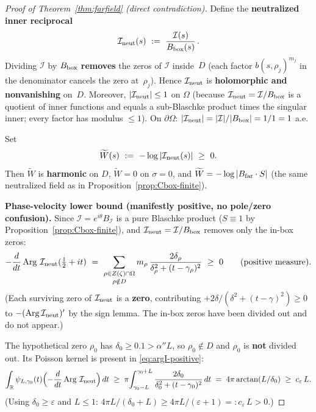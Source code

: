 \documentclass[11pt]{amsart}
\theoremstyle{definition}
\theoremstyle{remark}
\DeclareMathOperator{\Arg}{Arg}
\begin{document}
\begin{proof}[Proof of Theorem~\ref{thm:farfield} (direct contradiction)]
Define the \textbf{neutralized inner reciprocal}
\[
  \mathcal I_{\rm neut}(s)\ :=\ \frac{\mathcal I(s)}{B_{\rm box}(s)}\,.
\]
Dividing \(\mathcal I\) by \(B_{\rm box}\) \textbf{removes} the zeros of \(\mathcal I\) inside~\(D\)
(each factor \(b(s,\rho_j)^{m_j}\) in the denominator cancels the zero at~\(\rho_j\)).
Hence \(\mathcal I_{\rm neut}\) is \textbf{holomorphic and nonvanishing} on~\(D\).
Moreover, \(|\mathcal I_{\rm neut}|\le 1\) on \(\Omega\)
(because \(\mathcal I_{\rm neut}=\mathcal I/B_{\rm box}\) is a quotient of inner functions
and equals a sub-Blaschke product times the singular inner; every factor has modulus \(\le 1\)).
On \(\partial\Omega\): \(|\mathcal I_{\rm neut}|=|\mathcal I|/|B_{\rm box}|=1/1=1\) a.e.

Set
\[
  \widetilde W(s)\ :=\ -\log|\mathcal I_{\rm neut}(s)|\ \ge\ 0.
\]
Then \(\widetilde W\) is \textbf{harmonic} on \(D\), \(\widetilde W=0\) on \(\sigma=0\),
and \(\widetilde W=-\log|B_{\rm far}\cdot S|\) (the same neutralized field
as in Proposition~\ref{prop:Cbox-finite}).

\medskip
\noindent\textbf{Phase-velocity lower bound (manifestly positive, no pole/zero confusion).}
Since \(\mathcal I=e^{i\theta}B_{\mathcal I}\) is a pure Blaschke product
(\(S\equiv 1\) by Proposition~\ref{prop:Cbox-finite}),
and \(\mathcal I_{\rm neut}=\mathcal I/B_{\rm box}\) removes only the in-box zeros:
\begin{equation}\label{eq:argI-positive}
  -\frac{d}{dt}\Arg\,\mathcal I_{\rm neut}(\tfrac12+it)
  \ =\ \sum_{\substack{\rho\in Z(\zeta)\cap\Omega\\[1pt]\rho\notin D}}
  m_\rho\,\frac{2\delta_\rho}{\delta_\rho^2+(t-\gamma_\rho)^2}
  \ \ge\ 0\qquad\text{(positive measure).}
\end{equation}
(Each surviving zero of \(\mathcal I_{\rm neut}\) is a \textbf{zero}, contributing
\(+2\delta/(\delta^2+(t-\gamma)^2)\ge 0\) to \(-(\Arg\mathcal I_{\rm neut})'\)
by the sign lemma.
The in-box zeros have been divided out and do not appear.)

The hypothetical zero \(\rho_0\) has \(\delta_0\ge 0.1>\alpha''L\),
so \(\rho_0\notin D\) and \(\rho_0\) is \textbf{not} divided out.
Its Poisson kernel is present in \eqref{eq:argI-positive}:
\begin{equation}\label{eq:lower-zero}
  \int_{\mathbb R}\psi_{L,\gamma_0}(t)\Bigl(-\frac{d}{dt}\Arg\,\mathcal I_{\rm neut}\Bigr)\,dt
  \;\ge\; \pi\!\int_{\gamma_0-L}^{\gamma_0+L}\frac{2\delta_0}{\delta_0^2+(t-\gamma_0)^2}\,dt
  \;=\; 4\pi\arctan(L/\delta_0)
  \;\ge\; c_\varepsilon\,L.
\end{equation}
(Using \(\delta_0\ge\varepsilon\) and \(L\le 1\):
\(4\pi L/(\delta_0+L)\ge 4\pi L/(\varepsilon+1)=:c_\varepsilon\,L>0\).)


\end{proof}
\end{document}
